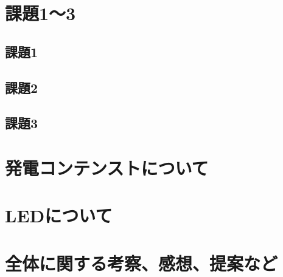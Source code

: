 \documentclass[11pt]{ltjsarticle}
\begin{document}
\section{課題1〜3}
	\subsection{課題1}
	\subsection{課題2}
	\subsection{課題3}
\section{発電コンテンストについて}
\section{LEDについて}
\section{全体に関する考察、感想、提案など}
\end{document}
